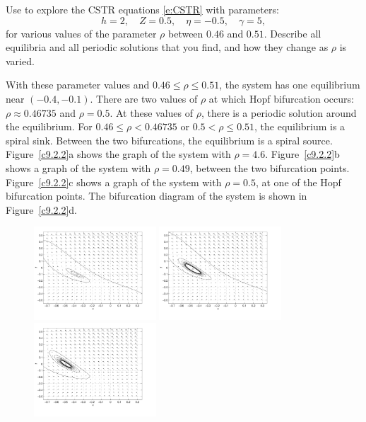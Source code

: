 \documentclass{ximera}
\begin{document}
\begin{computerExercise} \label{c9.2.2}
Use {\pplane} to explore the CSTR equations \eqref{e:CSTR} with
parameters:
\[
h=2, \quad Z=0.5, \quad \eta=-0.5, \quad \gamma=5,
\]
for various values of the parameter $\rho$ between $0.46$ and 
$0.51$.  Describe all equilibria and all periodic solutions that 
you find, and how they change as $\rho$ is varied.

\begin{solution}

With these parameter values and $0.46 \leq \rho \leq 0.51$, the system
has one equilibrium near $(-0.4,-0.1)$.  There are two values of $\rho$
at which Hopf bifurcation occurs: $\rho \approx 0.46735$ and
$\rho = 0.5$.  At these values of $\rho$, there is a periodic solution
around the equilibrium.  For $0.46 \leq \rho < 0.46735$ or $0.5 < \rho
\leq 0.51$, the equilibrium is a spiral sink.  Between the two
bifurcations, the equilibrium is a spiral source.  Figure~\ref{c9.2.2}a
shows the {\pplane} graph of the system with $\rho = 4.6$. 
Figure~\ref{c9.2.2}b shows a graph of the system with $\rho = 0.49$,
between the two bifurcation points.  Figure~\ref{c9.2.2}c shows a graph
of the system with $\rho = 0.5$, at one of the Hopf bifurcation points.
The bifurcation diagram of the system is shown in Figure~\ref{c9.2.2}d.

\begin{figure}[htb]
                       \centerline{%
                       \includegraphics[width=1.8in]{exfigure/9-2-2a.pdf}
                       \includegraphics[width=1.8in]{exfigure/9-2-2b.pdf}
                       \includegraphics[width=1.8in]{exfigure/9-2-2c.pdf}}
\end{figure}


\end{solution}
\end{computerExercise}
\end{document}
